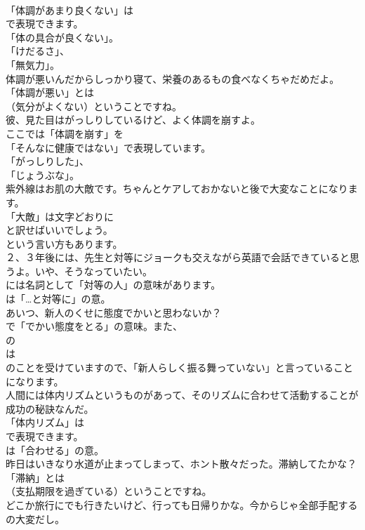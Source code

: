 \documentclass[8pt]{extreport}
\begin{document}
\begin{CJK}{UTF8}{min}
\\	「体調があまり良くない」は
\\	で表現できます。
\\	「体の具合が良くない」。
\\	「けだるさ」、
\\	「無気力」。	
\\	体調が悪いんだからしっかり寝て、栄養のあるもの食べなくちゃだめだよ。 
\\	「体調が悪い」とは 
\\	（気分がよくない）ということですね。	
\\	彼、見た目はがっしりしているけど、よく体調を崩すよ。 
\\	ここでは「体調を崩す」を
\\	「そんなに健康ではない」で表現しています。
\\	「がっしりした」、
\\	「じょうぶな」。	
\\	紫外線はお肌の大敵です。ちゃんとケアしておかないと後で大変なことになります。 
\\	「大敵」は文字どおりに 
\\	と訳せばいいでしょう。
\\	という言い方もあります。	
\\	２、３年後には、先生と対等にジョークも交えながら英語で会話できていると思うよ。いや、そうなっていたい。 
\\	には名詞として「対等の人」の意味があります。
\\	は「…と対等に」の意。	
\\	あいつ、新人のくせに態度でかいと思わないか？ 
\\	で「でかい態度をとる」の意味。また、
\\	の
\\	は
\\	のことを受けていますので、「新人らしく振る舞っていない」と言っていることになります。	
\\	人間には体内リズムというものがあって、そのリズムに合わせて活動することが成功の秘訣なんだ。 
\\	「体内リズム」は 
\\	で表現できます。
\\	は「合わせる」の意。	
\\	昨日はいきなり水道が止まってしまって、ホント散々だった。滞納してたかな？ 
\\	「滞納」とは
\\	（支払期限を過ぎている）ということですね。	
\\	どこか旅行にでも行きたいけど、行っても日帰りかな。今からじゃ全部手配するの大変だし。 

\end{CJK}
\end{document}
